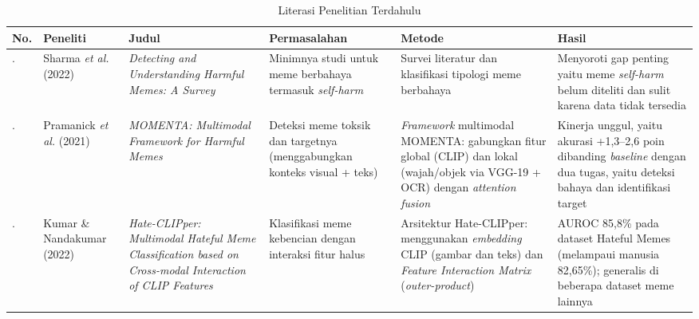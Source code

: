 \begin{landscape}
\begin{table}[H]
    \centering
    \caption{Literasi Penelitian Terdahulu}
    \label{table:2.literasi}
    \small
    \setlength{\tabcolsep}{4pt}
    \renewcommand{\arraystretch}{1.2}
    \begin{tabular}{>{\raggedright\arraybackslash}m{0.4cm} >{\raggedright\arraybackslash}m{1.6cm} >{\raggedright\arraybackslash}m{3cm} >{\raggedright\arraybackslash}m{2.8cm} >{\raggedright\arraybackslash}m{3cm} >{\raggedright\arraybackslash}m{3.8cm}}
        \hline
        \textbf{No.} & \textbf{Peneliti} & \textbf{Judul} & \textbf{Permasalahan} & \textbf{Metode} & \textbf{Hasil} \\
        \hline
        1. & Sharma \textit{et al.} (2022) \cite{Sharma2022HarmfulMemes} & \textit{Detecting and Understanding Harmful Memes: A Survey} & Minimnya studi untuk meme berbahaya termasuk \textit{self-harm} & Survei literatur dan klasifikasi tipologi meme berbahaya & Menyoroti gap penting yaitu meme \textit{self-harm} belum diteliti dan sulit karena data tidak tersedia \\
        \hline
        2. & Pramanick \textit{et al.} (2021) \cite{pramanick2021momenta} & \textit{MOMENTA: Multimodal Framework for Harmful Memes} & Deteksi meme toksik dan targetnya (menggabungkan konteks visual + teks) & \textit{Framework} multimodal MOMENTA: gabungkan fitur global (CLIP) dan lokal (wajah/objek via VGG-19 + OCR) dengan \textit{attention fusion} & Kinerja unggul, yaitu akurasi +1,3--2,6 poin dibanding \textit{baseline} dengan dua tugas, yaitu deteksi bahaya dan identifikasi target \\
        \hline
        3. & Kumar \& Nandakumar (2022) \cite{kumar2022hateclipper} & \textit{Hate-CLIPper: Multimodal Hateful Meme Classification based on Cross-modal Interaction of CLIP Features} & Klasifikasi meme kebencian dengan interaksi fitur halus & Arsitektur Hate-CLIPper: menggunakan \textit{embedding} CLIP (gambar dan teks) dan \textit{Feature Interaction Matrix} (\textit{outer-product}) & AUROC 85,8\% pada dataset Hateful Memes (melampaui manusia 82,65\%); generalis di beberapa dataset meme lainnya \\
        \hline
    \end{tabular}
\end{table}

\vspace{0.5cm}


\end{landscape}
